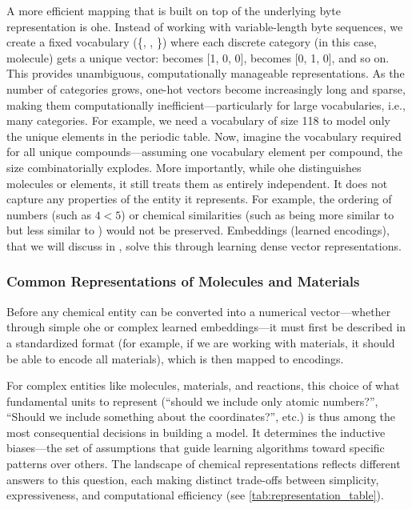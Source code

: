 A more efficient mapping that is built on top of the underlying byte representation is \gls{ohe}. 
Instead of working with variable-length byte sequences, we create a fixed vocabulary (\{, , \}) where each discrete category (in this case, molecule) gets a unique vector:  becomes [1, 0, 0],  becomes [0, 1, 0], and so on. 
This provides unambiguous, computationally manageable representations. 
As the number of categories grows, one-hot vectors become increasingly long and sparse, making them computationally inefficient---particularly for large vocabularies, i.e., many categories.
For example, we need a vocabulary of size 118 to model only the unique elements in the periodic table. 
Now, imagine the vocabulary required for all unique compounds---assuming one vocabulary element per compound, the size combinatorially explodes.
More importantly, while \gls{ohe} distinguishes molecules or elements, it still treats them as entirely independent. 
It does not capture any properties of the entity it represents. For example, the ordering of numbers (such as $4<5$) or chemical similarities (such as  being more similar to  but less similar to ) would not be preserved. \autocite{chuang2018comment}
Embeddings (learned encodings), that we will discuss in , solve this through learning dense vector representations.

\subsubsection{Common Representations of Molecules and Materials}
\label{sec:common_representations}

Before any chemical entity can be converted into a numerical vector---whether through simple \gls{ohe} or complex learned embeddings---it must first be described in a standardized format (for example, if we are working with materials, it should be able to encode all materials), which is then mapped to encodings. 

For complex entities like molecules, materials, and reactions, this choice of what fundamental units to represent  (\enquote{should we include only atomic numbers?}, \enquote{Should we include something about the coordinates?}, etc.) is thus among the most consequential decisions in building a model. 
It determines the inductive biases---the set of assumptions that guide learning algorithms toward specific patterns over others.\autocite{huang2016understanding} 
The landscape of chemical representations reflects different answers to this question, each making distinct trade-offs between simplicity, expressiveness, and computational efficiency (see \cref{tab:representation_table}).


